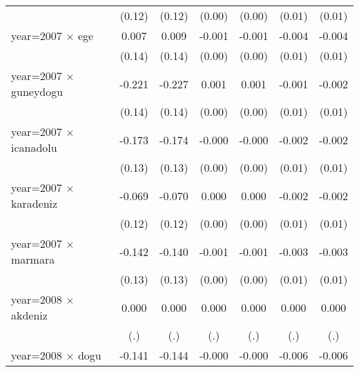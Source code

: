 {\begin{tabular}{l*{6}{c}}
                    &      (0.12)         &      (0.12)         &      (0.00)         &      (0.00)         &      (0.01)         &      (0.01)         \\
year=2007 $\times$ ege&       0.007         &       0.009         &      -0.001         &      -0.001         &      -0.004         &      -0.004         \\
                    &      (0.14)         &      (0.14)         &      (0.00)         &      (0.00)         &      (0.01)         &      (0.01)         \\
year=2007 $\times$ guneydogu&      -0.221         &      -0.227         &       0.001         &       0.001         &      -0.001         &      -0.002         \\
                    &      (0.14)         &      (0.14)         &      (0.00)         &      (0.00)         &      (0.01)         &      (0.01)         \\
year=2007 $\times$ icanadolu&      -0.173         &      -0.174         &      -0.000         &      -0.000         &      -0.002         &      -0.002         \\
                    &      (0.13)         &      (0.13)         &      (0.00)         &      (0.00)         &      (0.01)         &      (0.01)         \\
year=2007 $\times$ karadeniz&      -0.069         &      -0.070         &       0.000         &       0.000         &      -0.002         &      -0.002         \\
                    &      (0.12)         &      (0.12)         &      (0.00)         &      (0.00)         &      (0.01)         &      (0.01)         \\
year=2007 $\times$ marmara&      -0.142         &      -0.140         &      -0.001         &      -0.001         &      -0.003         &      -0.003         \\
                    &      (0.13)         &      (0.13)         &      (0.00)         &      (0.00)         &      (0.01)         &      (0.01)         \\
year=2008 $\times$ akdeniz&       0.000         &       0.000         &       0.000         &       0.000         &       0.000         &       0.000         \\
                    &         (.)         &         (.)         &         (.)         &         (.)         &         (.)         &         (.)         \\
year=2008 $\times$ dogu&      -0.141         &      -0.144         &      -0.000         &      -0.000         &      -0.006         &      -0.006         \\

\end{tabular}}
